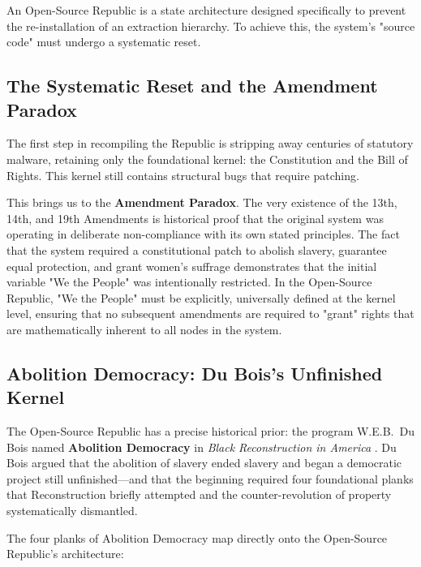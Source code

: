 An Open-Source Republic is a state architecture designed specifically to prevent the re-installation of an extraction hierarchy. To achieve this, the system's "source code" must undergo a systematic reset.

\subsection{The Systematic Reset and the Amendment Paradox}

The first step in recompiling the Republic is stripping away centuries of statutory malware, retaining only the foundational kernel: the Constitution and the Bill of Rights. This kernel still contains structural bugs that require patching. 

This brings us to the \textbf{Amendment Paradox}. The very existence of the 13th, 14th, and 19th Amendments is historical proof that the original system was operating in deliberate non-compliance with its own stated principles. The fact that the system required a constitutional patch to abolish slavery, guarantee equal protection, and grant women's suffrage demonstrates that the initial variable "We the People" was intentionally restricted. In the Open-Source Republic, "We the People" must be explicitly, universally defined at the kernel level, ensuring that no subsequent amendments are required to "grant" rights that are mathematically inherent to all nodes in the system.

\subsection{Abolition Democracy: Du Bois's Unfinished Kernel}

The Open-Source Republic has a precise historical prior: the program W.E.B.\ Du Bois named \textbf{Abolition Democracy} in \textit{Black Reconstruction in America} \cite{dubois}. Du Bois argued that the abolition of slavery ended slavery and began a democratic project still unfinished---and that the beginning required four foundational planks that Reconstruction briefly attempted and the counter-revolution of property systematically dismantled.

The four planks of Abolition Democracy map directly onto the Open-Source Republic's architecture:

